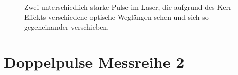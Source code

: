 \documentclass[bachelor,       %
               twoside,        %
               BCOR10mm,       %
               english,ngerman, %
               ]{GAUBM}
\begin{document}
\begin{figure}[!htb]
   \centering   
   \hfill
   \caption{Zwei unterschiedlich starke Pulse im Laser, die aufgrund des Kerr-Effekts verschiedene optische Weglängen sehen und sich so gegeneinander verschieben.}
   \label{fig:running441}
 \end{figure}


\section{Doppelpulse Messreihe 2}
\end{document}
